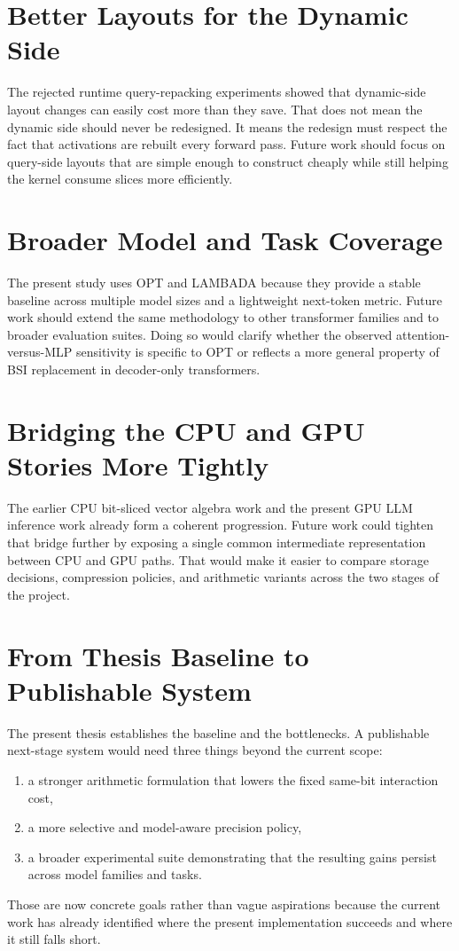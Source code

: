 \section{Better Layouts for the Dynamic Side}
The rejected runtime query-repacking experiments showed that dynamic-side layout changes can easily cost more than they save. That does not mean the dynamic side should never be redesigned. It means the redesign must respect the fact that activations are rebuilt every forward pass. Future work should focus on query-side layouts that are simple enough to construct cheaply while still helping the kernel consume slices more efficiently.

\section{Broader Model and Task Coverage}
The present study uses OPT and LAMBADA because they provide a stable baseline across multiple model sizes and a lightweight next-token metric. Future work should extend the same methodology to other transformer families and to broader evaluation suites. Doing so would clarify whether the observed attention-versus-MLP sensitivity is specific to OPT or reflects a more general property of BSI replacement in decoder-only transformers.

\section{Bridging the CPU and GPU Stories More Tightly}
The earlier CPU bit-sliced vector algebra work and the present GPU LLM inference work already form a coherent progression. Future work could tighten that bridge further by exposing a single common intermediate representation between CPU and GPU paths. That would make it easier to compare storage decisions, compression policies, and arithmetic variants across the two stages of the project.

\section{From Thesis Baseline to Publishable System}
The present thesis establishes the baseline and the bottlenecks. A publishable next-stage system would need three things beyond the current scope:

\begin{enumerate}[leftmargin=2em]
\item a stronger arithmetic formulation that lowers the fixed same-bit interaction cost,
\item a more selective and model-aware precision policy,
\item a broader experimental suite demonstrating that the resulting gains persist across model families and tasks.
\end{enumerate}

Those are now concrete goals rather than vague aspirations because the current work has already identified where the present implementation succeeds and where it still falls short.
